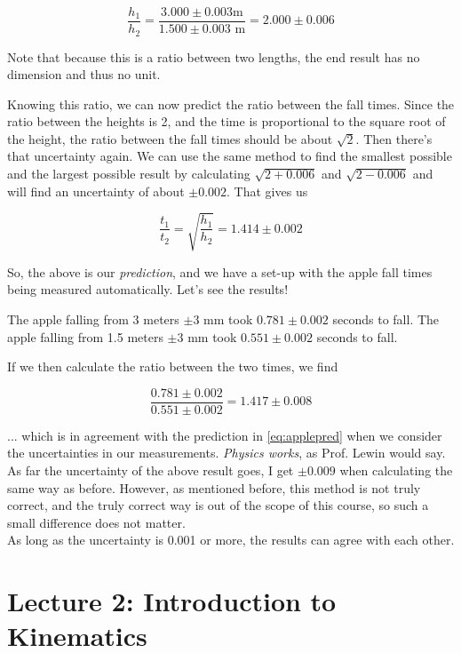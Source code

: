 \begin{equation}
 \frac{h_1}{h_2} = \frac{3.000 \pm 0.003 \text {m}}{1.500 \pm 0.003 \text{ m}} = 2.000 \pm 0.006
\end{equation}

Note that because this is a ratio between two lengths, the end result has no dimension and thus no unit.

Knowing this ratio, we can now predict the ratio between the fall times. Since the ratio between the heights is 2, and the time is proportional to the square root of the height, the ratio between the fall times should be about $\sqrt{2}$. Then there's that uncertainty again. We can use the same method to find the smallest possible and the largest possible result by calculating $\sqrt{2+0.006}$ and $\sqrt{2-0.006}$ and will find an uncertainty of about $\pm 0.002$. That gives us

\begin{equation}
 \frac{t_1}{t_2} = \sqrt{\frac{h_1}{h_2}} = 1.414 \pm 0.002 \label{eq:applepred}
\end{equation}

So, the above is our \emph{prediction}, and we have a set-up with the apple fall times being measured automatically. Let's see the results!

The apple falling from 3 meters $\pm 3$ mm took $0.781 \pm 0.002$ seconds to fall. The apple falling from 1.5 meters $\pm 3$ mm took $0.551 \pm 0.002$ seconds to fall.

If we then calculate the ratio between the two times, we find

\begin{equation}
\frac{0.781 \pm 0.002}{0.551 \pm 0.002} = 1.417 \pm 0.008
\end{equation}

... which is in agreement with the prediction in \eqref{eq:applepred} when we consider the uncertainties in our measurements. \emph{Physics works}, as Prof. Lewin would say.\\
As far the uncertainty of the above result goes, I get $\pm 0.009$ when calculating the same way as before. However, as mentioned before, this method is not truly correct, and the truly correct way is out of the scope of this course, so such a small difference does not matter.\\
As long as the uncertainty is 0.001 or more, the results can agree with each other.

\section{Lecture 2: Introduction to Kinematics}


